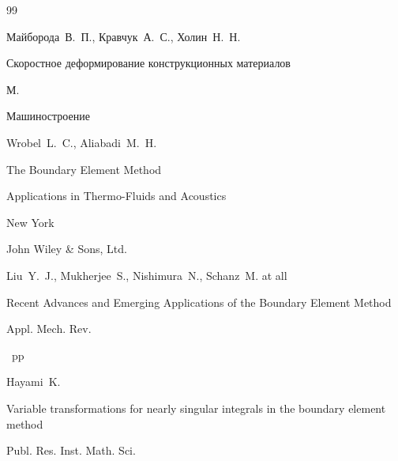 




\begin{thebibliography}{99}




\by Майборода~В.~П., Кравчук~А.~С., Холин~Н.~Н.

\book Скоростное деформирование конструкционных материалов

\publaddr М.

\publ Машиностроение






\by Wrobel~L.~C., Aliabadi~M.~H.

\book The Boundary Element Method


\volinfo Applications in Thermo-Fluids and Acoustics 

\publaddr New York

\publ John Wiley {\&} Sons, Ltd.






\by Liu~Y.~J., Mukherjee~S., Nishimura~N., Schanz~M. at all

\paper Recent Advances and Emerging Applications of the Boundary Element Method 

\jour Appl. Mech. Rev.





~pp \nofrills





\by Hayami~K.

\paper  Variable transformations for nearly singular integrals in the boundary element method 

\jour  Publ. Res. Inst. Math. Sci. 




\end{thebibliography}
